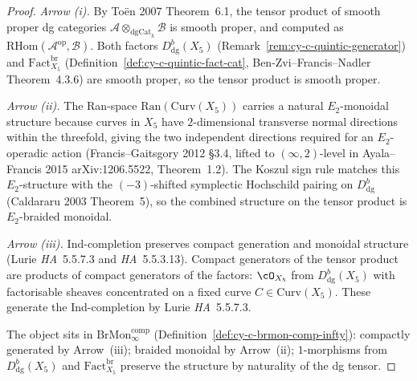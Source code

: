 \begin{proof}
\emph{Arrow (i).} By To\"en 2007 Theorem~6.1, the tensor product of
smooth proper dg categories
$\mathcal A \otimes_{\mathrm{dgCat}_k} \mathcal B$ is smooth proper, and
computed as $\mathrm{RHom}(\mathcal A^{\mathrm{op}}, \mathcal B)$. Both
factors $D^b_{\mathrm{dg}}(X_5)$ (Remark~\ref{rem:cy-c-quintic-generator})
and $\mathrm{Fact}^{\mathrm{br}}_{X_5}$
(Definition~\ref{def:cy-c-quintic-fact-cat}, Ben-Zvi--Francis--Nadler
Theorem~4.3.6) are smooth proper, so the tensor product is smooth
proper.

\emph{Arrow (ii).} The Ran-space $\mathrm{Ran}(\mathrm{Curv}(X_5))$
carries a natural $E_2$-monoidal structure because curves in $X_5$ have
$2$-dimensional transverse normal directions within the threefold,
giving the two independent directions required for an $E_2$-operadic
action (Francis--Gaitsgory 2012 \S 3.4, lifted to $(\infty,2)$-level
in Ayala--Francis 2015 arXiv:1206.5522, Theorem~1.2). The Koszul sign
rule matches this $E_2$-structure with the $(-3)$-shifted symplectic
Hochschild pairing on $D^b_{\mathrm{dg}}$ (Caldararu 2003 Theorem~5),
so the combined structure on the tensor product is $E_2$-braided
monoidal.

\emph{Arrow (iii).} $\mathrm{Ind}$-completion preserves compact
generation and monoidal structure (Lurie \emph{HA}~5.5.7.3 and
\emph{HA}~5.5.3.13). Compact generators of the tensor product are
products of compact generators of the factors: $\cO_{X_5}$ from
$D^b_{\mathrm{dg}}(X_5)$ with factorisable sheaves concentrated on a
fixed curve $C \in \mathrm{Curv}(X_5)$. These generate the Ind-completion
by Lurie \emph{HA}~5.5.7.3.

The object sits in $\mathrm{BrMon}^{\mathrm{comp}}_\infty$
(Definition~\ref{def:cy-c-brmon-comp-infty}): compactly generated by
Arrow~(iii); braided monoidal by Arrow~(ii); $1$-morphisms from
$D^b_{\mathrm{dg}}(X_5)$ and $\mathrm{Fact}^{\mathrm{br}}_{X_5}$
preserve the structure by naturality of the dg tensor.
\end{proof}

